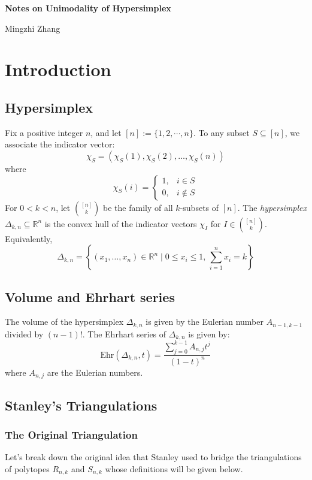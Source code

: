 \documentclass[12pt]{article}
\theoremstyle{definition}
\numberwithin{equation}{subsection}
\begin{document}
\begin{center}
    {\Large\bf Notes on Unimodality of Hypersimplex}
\end{center}
\vskip 3mm
\begin{center}
    Mingzhi Zhang
\end{center}
\vskip 3mm

\section{Introduction}

\subsection{Hypersimplex}
Fix a positive integer $n$, and let $[n]:= \{1, 2, \cdots , n\}$. To any subset $S \subseteq [n]$, we associate the indicator vector:
\[
\chi_{S} = (\chi_{S}(1), \chi_{S}(2), \ldots, \chi_{S}(n))
\]
where 
\[
\chi_{S}(i) = 
\begin{cases} 
1, & i \in S \\
0, & i \notin S
\end{cases}
\]
For $0 < k < n$, let $\binom{[n]}{k}$ be the family of all $k$-subsets of $[n]$. The \textit{hypersimplex} $\Delta_{k,n} \subseteq \mathbb{R}^n$ is the convex hull of the indicator vectors $\chi_I$ for $I \in \binom{[n]}{k}$. Equivalently,
\[
\Delta_{k,n} = \left\{ (x_1, \ldots, x_n) \in \mathbb{R}^n \mid 0 \leq x_i \leq 1,\, \sum_{i=1}^n x_i = k \right\}
\]

\subsection{Volume and Ehrhart series}
The volume of the hypersimplex $\Delta_{k,n}$ is given by the Eulerian number $A_{n-1,k-1}$ divided by $(n-1)!$. The Ehrhart series of $\Delta_{k,n}$ is given by:
\[
\text{Ehr}(\Delta_{k,n}, t) = \frac{\sum_{j=0}^{k-1} A_{n,j} t^j}{(1-t)^n}
\]
where $A_{n,j}$ are the Eulerian numbers.

\subsection{Stanley's Triangulations}
\subsubsection{The Original Triangulation}
Let's break down the original idea that Stanley used to bridge the triangulations of polytopes $R_{n,k}$ and $S_{n,k}$ whose definitions will be given below.
\end{document}
